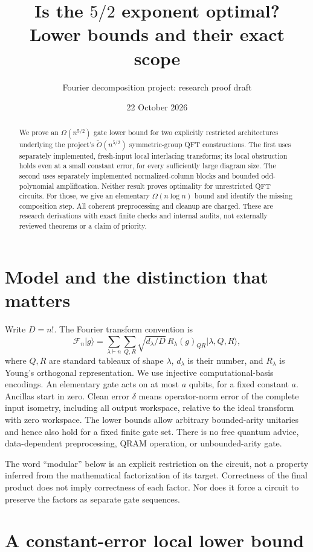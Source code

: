 \documentclass[11pt]{article}
\title{Is the $5/2$ exponent optimal?\\Lower bounds and their exact scope}
\author{Fourier decomposition project: research proof draft}
\date{22 October 2026}
\theoremstyle{definition}
\newcommand{\ket}[1]{\lvert #1\rangle}
\newcommand{\F}{\mathcal F}
\begin{document}
\maketitle
\begin{abstract}
We prove an $\Omega(n^{5/2})$ gate lower bound for two explicitly restricted
architectures underlying the project's $\widetilde O(n^{5/2})$ symmetric-group
QFT constructions. The first uses separately implemented, fresh-input local
interlacing transforms; its local obstruction holds even at a small constant
error, for every sufficiently large diagram size. The second uses separately
implemented normalized-column blocks and bounded odd-polynomial amplification.
Neither result proves optimality for unrestricted QFT circuits. For those,
we give an elementary $\Omega(n\log n)$ bound and identify the missing
composition step. All coherent preprocessing and cleanup are charged.
These are research derivations with exact finite checks and internal audits,
not externally reviewed theorems or a claim of priority.
\end{abstract}

\section{Model and the distinction that matters}

Write $D=n!$. The Fourier transform convention is
\[
 \F_n\ket{g}=\sum_{\lambda\vdash n}\sum_{Q,R}
 \sqrt{d_\lambda/D}\,R_\lambda(g)_{QR}\ket{\lambda,Q,R},
\]
where $Q,R$ are standard tableaux of shape $\lambda$, $d_\lambda$ is their
number, and $R_\lambda$ is Young's orthogonal representation. We use injective
computational-basis encodings. An elementary gate acts on at most $a$ qubits,
for a fixed constant $a$. Ancillas start in zero. Clean error $\delta$ means
operator-norm error of the complete input isometry, including all output
workspace, relative to the ideal transform with zero workspace. The lower
bounds allow arbitrary bounded-arity unitaries and hence also hold for a
fixed finite gate set. There is no free quantum advice, data-dependent
preprocessing, QRAM operation, or unbounded-arity gate.

The word ``modular'' below is an explicit restriction on the circuit, not a
property inferred from the mathematical factorization of its target.
Correctness of the final product does not imply correctness of each factor.
Nor does it force a circuit to preserve the factors as separate gate sequences.

\section{A constant-error local lower bound}
\end{document}

